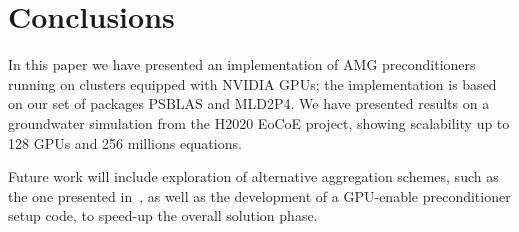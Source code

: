 \section{Conclusions}
In this paper we have presented an implementation of AMG
preconditioners running on clusters equipped with NVIDIA GPUs; the
implementation is based on our set of packages PSBLAS and MLD2P4. 
We have presented results on a groundwater simulation from the H2020
EoCoE project, showing scalability up to 128 GPUs and 256 millions
equations. 

Future work will include exploration of alternative aggregation
schemes, such as the one presented in~\cite{bcm-toms}, as well as the
development of a GPU-enable preconditioner setup code, to speed-up the
overall solution phase. 